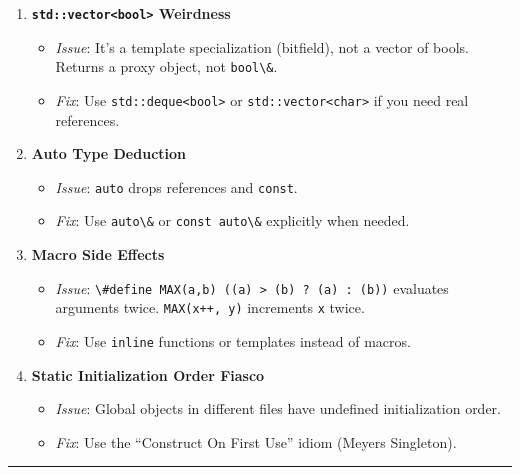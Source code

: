 \begin{enumerate}
\def\labelenumi{\arabic{enumi}.}
\setcounter{enumi}{17}
\tightlist
\item
  \textbf{\passthrough{\lstinline!std::vector<bool>!} Weirdness}

  \begin{itemize}
  \tightlist
  \item
    \emph{Issue}: It's a template specialization (bitfield), not a
    vector of bools. Returns a proxy object, not
    \passthrough{\lstinline!bool\&!}.
  \item
    \emph{Fix}: Use \passthrough{\lstinline!std::deque<bool>!} or
    \passthrough{\lstinline!std::vector<char>!} if you need real
    references.
  \end{itemize}
\item
  \textbf{Auto Type Deduction}

  \begin{itemize}
  \tightlist
  \item
    \emph{Issue}: \passthrough{\lstinline!auto!} drops references and
    \passthrough{\lstinline!const!}.
  \item
    \emph{Fix}: Use \passthrough{\lstinline!auto\&!} or
    \passthrough{\lstinline!const auto\&!} explicitly when needed.
  \end{itemize}
\item
  \textbf{Macro Side Effects}

  \begin{itemize}
  \tightlist
  \item
    \emph{Issue}:
    \passthrough{\lstinline!\#define MAX(a,b) ((a) > (b) ? (a) : (b))!}
    evaluates arguments twice. \passthrough{\lstinline!MAX(x++, y)!}
    increments \passthrough{\lstinline!x!} twice.
  \item
    \emph{Fix}: Use \passthrough{\lstinline!inline!} functions or
    templates instead of macros.
  \end{itemize}
\item
  \textbf{Static Initialization Order Fiasco}

  \begin{itemize}
  \tightlist
  \item
    \emph{Issue}: Global objects in different files have undefined
    initialization order.
  \item
    \emph{Fix}: Use the ``Construct On First Use'' idiom (Meyers
    Singleton).
  \end{itemize}
\end{enumerate}

\begin{center}\rule{0.5\linewidth}{0.5pt}\end{center}
